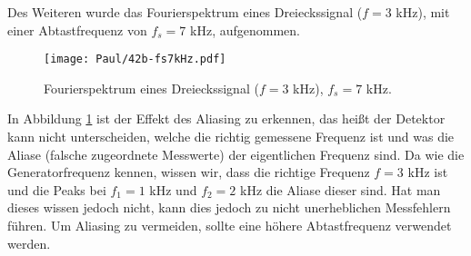 \newpage
Des Weiteren wurde das Fourierspektrum eines Dreieckssignal ($f = 3$ kHz), mit einer Abtastfrequenz von $f_s = 7$ kHz, aufgenommen.
\begin{figure}[h]
    \centering
    \texttt{[image: Paul/42b-fs7kHz.pdf]}
    \caption{Fourierspektrum eines Dreieckssignal ($f = 3$ kHz), $f_s = 7$ kHz.}
    \label{fig:42a3}
\end{figure}

In Abbildung \ref{fig:42a3} ist der Effekt des Aliasing zu erkennen, das heißt der Detektor kann nicht unterscheiden, welche die richtig gemessene Frequenz ist und was die Aliase (falsche zugeordnete Messwerte) der eigentlichen Frequenz sind. Da wie die Generatorfrequenz kennen, wissen wir, dass die richtige Frequenz $f=3$ kHz ist und die Peaks bei $f_1=1$ kHz und $f_2=2$ kHz die Aliase dieser sind. Hat man dieses wissen jedoch nicht, kann dies jedoch zu nicht unerheblichen Messfehlern führen. Um Aliasing zu vermeiden, sollte eine höhere Abtastfrequenz verwendet werden.